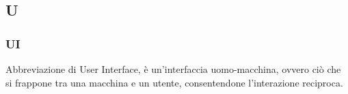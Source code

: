 \subsection*{\textbf{\hfill \Huge{U} \hfill}} 
\subsubsection*{UI}
Abbreviazione di User Interface, è un'interfaccia uomo-macchina, ovvero ciò che si frappone tra una macchina e un utente, consentendone l'interazione reciproca.